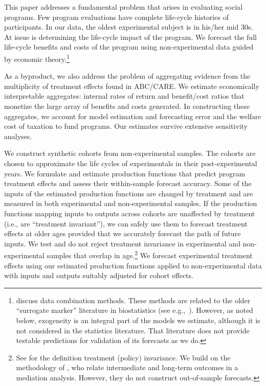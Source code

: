 This paper addresses a fundamental problem that arises in evaluating social programs. Few program evaluations have complete life-cycle histories of participants. In our data, the oldest experimental subject is in his/her mid 30s. At issue is determining the life-cycle impact of the program. We forecast the full life-cycle benefits and costs of the program using non-experimental data guided by economic theory.\footnote{\citet{Ridder_Moffitt_2007_hbk_metricsdata} discuss data combination methods. These methods are related to the older ``surrogate marker'' literature in biostatistics (see e.g.,\ \citealp{Prentice_1989_Surrogate_SiM}). However, as noted below, exogeneity is an integral part of the models we estimate, although it is not considered in the statistics literature. That literature does not provide testable predictions for validation of its forecasts as we do.}

As a byproduct, we also address the problem of aggregating evidence from the multiplicity of treatment effects found in ABC/CARE. We estimate economically interpretable aggregates: internal rates of return and benefit/cost ratios that monetize the large array of benefits and costs generated. In constructing these aggregates, we account for model estimation and forecasting error and the welfare cost of taxation to fund programs. Our estimates survive extensive sensitivity analyses.

We construct synthetic cohorts from non-experimental samples. The cohorts are chosen to approximate the life cycles of experimentals in their post-experimental years. We formulate and estimate production functions that predict program treatment effects and assess their within-sample forecast accuracy. Some of the inputs of the estimated production functions are changed by treatment and are measured in both experimental and non-experimental samples. If the production functions mapping inputs to outputs across cohorts are unaffected by treatment (i.e., are ``treatment invariant''), we can safely use them to forecast treatment effects at older ages provided that we accurately forecast the path of future inputs. We test and do not reject treatment invariance in experimental and non-experimental samples that overlap in age.\footnote{See \cite{Hurwicz_1962_structural} for the definition treatment (policy) invariance. We build on the methodology of \citet{Heckman_Pinto_etal_2013_PerryFactor}, who relate intermediate and long-term outcomes in a mediation analysis. However, they do not construct out-of-sample forecasts.} We forecast experimental treatment effects using our estimated production functions applied to non-experimental data with inputs and outputs suitably adjusted for cohort effects.

